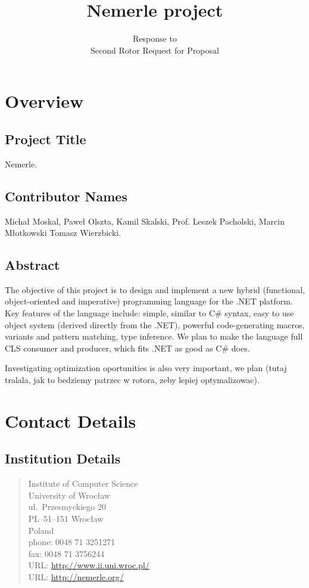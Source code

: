 \documentclass[a4paper,11pt]{article}
\title{Nemerle project}
\author{Response to\\Second Rotor Request for Proposal}
\date{}
\begin{document}
\maketitle
\thispagestyle{empty}

\section{Overview}

\subsection{Project Title}

Nemerle.

\subsection{Contributor Names}
Micha{\l} Moskal, Pawe{\l} Olszta, Kamil Skalski, Prof. Leszek Pacholski, Marcin M{\l}otkowski
Tomasz Wierzbicki.

\subsection{Abstract}

The objective of this project is to design and implement a new hybrid
(functional, object-oriented and imperative) programming language for the
.NET platform. Key features of the language include: simple, similar to
C\# syntax, easy to use object system (derived directly from the .NET),
powerful code-generating macros, variants and pattern matching, type
inference. We plan to make the language full CLS consumer and producer,
which fits .NET as good as C\# does.

Investigating optimization oportunities is also very important, we
plan (tutaj tralala, jak to bedziemy patrzec w rotora, zeby lepiej
optymalizowac).

\section{Contact Details}


\subsection{Institution Details}

\begin{quote}
Institute of Computer Science\\
University of Wroc\l aw\\
ul.\ Przesmyckiego 20\\
PL--51--151 Wroc\l aw\\
Poland\\[2ex]
phone: 0048 71 3251271\\
fax:   0048 71 3756244\\
URL: \url{http://www.ii.uni.wroc.pl/}\\
URL: \url{http://nemerle.org/}
\end{quote}
\end{document}
